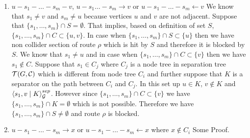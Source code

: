 \begin{prf}
\begin{enumerate}
		\item $u - s_1 - \dots - s_m - v$, $u - s_1 \dots - s_m \rightarrow v$ or $u - s_1 - \dots - s_m \leftarrow v$
			We know that $s_1 \neq v$ and $s_m \neq u$ because vertices $u$ and $v$ are not adjacent. Suppose that 
			$\{ s_1, \dots, s_m \} \cap S = \emptyset$. That implies, based on definition of set $S$, $\{ s_1, \dots, s_m \} \cap C \subset \{u, v\}$.
			In case when $\{ s_1, \dots, s_m \} \cap S \subset \{ u \}$ then we have non collider section of route $\rho$ which is hit by $S$ and therefore
			it is blocked by $S$. We know that $s_1 \neq u$ and in case when $\{ s_1, \dots, s_m \} \cap C \subset \{ v \}$ then we have $s_1 \not\in C$.
			Suppose that $s_1 \in C_j$ where $C_j$ is a node tree in separation tree $\mathcal{T}(G, \mathcal{C})$ which is different from node tree $C_i$ and further
			suppose that $K$ is a separator on the path between $C_i$ and $C_j$. In this set up $u \in K$, $v \not\in K$ and $\left\langle s_1 , v \mid K \right\rangle_{\mathcal{G}}^{sep}$.
			However since $\{ s_1, \dots, s_m \} \cap C \subset \{ v \}$ we have $\{ s_1, \dots, s_m \} \cap K = \emptyset$ which is not possible. 
			Therefore we have $\{ s_1, \dots, s_m \} \cap S \neq \emptyset$ and route $\rho$ is blocked.

		\item $u - s_1 - \dots - s_m \rightarrow x$ or $u - s_1 - \dots - s_m \leftarrow x$ where $x \not\in C_i$
			Some Proof.

	\end{enumerate}
	
	
\end{prf}











